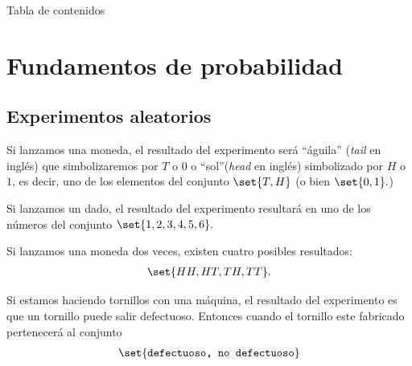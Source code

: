 
{Tabla de contenidos}
\tableofcontents


\section{Fundamentos de probabilidad}

\subsection{Experimentos aleatorios}

 \begin{ejemplo}
  \label{exmp:0.1.1}
  Si lanzamos una moneda, el resultado del experimento será ``águila'' (\emph{tail} en inglés) que simbolizaremos por $T$ o $0$ o ``sol''(\emph{head} en inglés) simbolizado por $H$ o $1$, es decir, uno de los elementos del conjunto $\set{T,H}$ (o bien $\set{0,1}.$)
 \end{ejemplo}



 \begin{ejemplo}
  \label{exmp:0.1.2}
  Si lanzamos un dado, el resultado del experimento resultará en uno de los números del conjunto $\set{1,2,3,4,5,6}.$
 \end{ejemplo}



 \begin{ejemplo}
  \label{exmp:0.1.3}
  Si lanzamos una moneda dos veces, existen cuatro posibles resultados:
  \begin{align*}
   \set{HH,HT,TH,TT}.
  \end{align*}

 \end{ejemplo}



 \begin{ejemplo}
  \label{exmp:0.1.4}
  Si estamos haciendo tornillos con una máquina, el resultado del experimento es que un tornillo puede salir defectuoso. Entonces cuando el tornillo este fabricado pertenecerá al conjunto
  \begin{align*}
   \set{\texttt{defectuoso, no defectuoso}}
  \end{align*}

 \end{ejemplo}



